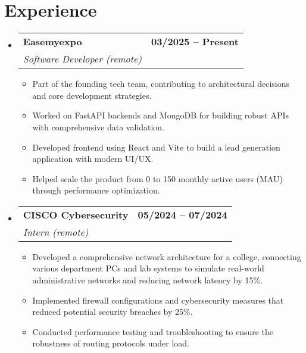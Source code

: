 \documentclass[letterpaper,11pt]{article}
\makeatletter
\newcommand{\resumeItem}[1]{%
  \item\small{
    {#1 \vspace{-2pt}}
  }
}
\newcommand{\resumeSubheading}[4]{
  \vspace{-2pt}\item
    \begin{tabular*}{1.0\textwidth}[t]{l@{\extracolsep{\fill}}r}
      \textbf{#1} & \textbf{\small #2} \\
      \textit{\small#3} & \textit{\small #4} \\
    \end{tabular*}\vspace{-7pt}
}
\newcommand{\resumeSubHeadingListStart}{\begin{itemize}[leftmargin=0.0in, label={}]}
\newcommand{\resumeSubHeadingListEnd}{\end{itemize}}
\newcommand{\resumeItemListStart}{\begin{itemize}}
\newcommand{\resumeItemListEnd}{\end{itemize}\vspace{-5pt}}
\makeatother
\begin{document}
\section{Experience}
  \resumeSubHeadingListStart

    \resumeSubheading
      {Easemyexpo}{03/2025 -- Present}
      {Software Developer (remote)}{}
      \resumeItemListStart
        \resumeItem{Part of the founding tech team, contributing to architectural decisions and core development strategies.}
        \resumeItem{Worked on FastAPI backends and MongoDB for building robust APIs with comprehensive data validation.}
        \resumeItem{Developed frontend using React and Vite to build a lead generation application with modern UI/UX.}
        \resumeItem{Helped scale the product from 0 to 150 monthly active users (MAU) through performance optimization.}
      \resumeItemListEnd

    \resumeSubheading
      {CISCO Cybersecurity}{05/2024 -- 07/2024}
      {Intern (remote)}{}
      \resumeItemListStart
        \resumeItem{Developed a comprehensive network architecture for a college, connecting various department PCs and lab systems to simulate real-world administrative networks and reducing network latency by 15\%.}
        \resumeItem{Implemented firewall configurations and cybersecurity measures that reduced potential security breaches by 25\%.}
        \resumeItem{Conducted performance testing and troubleshooting to ensure the robustness of routing protocols under load.}
      \resumeItemListEnd

  \resumeSubHeadingListEnd
\vspace{-16pt}

\end{document}
